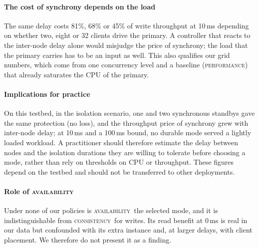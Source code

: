 \documentclass[preprint,12pt]{elsarticle}
\newcommand{\perf}{\textsc{performance}}
\newcommand{\cons}{\textsc{consistency}}
\newcommand{\avail}{\textsc{availability}}
\begin{document}
\paragraph{The cost of synchrony depends on the load}
The same delay costs 81\%, 68\% or 45\% of write throughput at 10\,ms depending on whether two, eight or 32 clients drive the primary. A controller that reacts to the inter-node delay alone would misjudge the price of synchrony; the load that the primary carries has to be an input as well. This also qualifies our grid numbers, which come from one concurrency level and a baseline (\perf) that already saturates the CPU of the primary.

\paragraph{Implications for practice}
On this testbed, in the isolation scenario, one and two synchronous standbys gave the same protection (no loss), and the throughput price of synchrony grew with inter-node delay; at 10\,ms and a 100\,ms bound, no durable mode served a lightly loaded workload. A practitioner should therefore estimate the delay between nodes and the isolation durations they are willing to tolerate before choosing a mode, rather than rely on thresholds on CPU or throughput. These figures depend on the testbed and should not be transferred to other deployments.

\paragraph{Role of \avail}
Under none of our policies is \avail\ the selected mode, and it is indistinguishable from \cons\ for writes. Its read benefit at 0\,ms is real in our data but confounded with its extra instance and, at larger delays, with client placement. We therefore do not present it as a finding.
\end{document}
